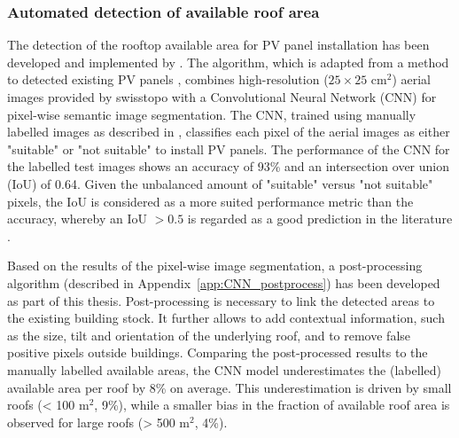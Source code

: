 \subsubsection{Automated detection of available roof area}

The detection of the rooftop available area for PV panel installation has been developed and implemented by \citet{castello_quantification_2021}.
The algorithm, which is adapted from a method to detected existing PV panels \cite{castello_deep_2019}, 
combines high-resolution ($25 \times 25$ cm$^2$) aerial images
provided by swisstopo \cite{swiss_federal_institue_of_topography_swisstopo_swissimage_nodate} with a Convolutional Neural Network (CNN) for pixel-wise semantic image segmentation. 
The CNN, trained using manually labelled images as described in \cite{castello_quantification_2021}, classifies each pixel of the aerial images as either "suitable" or "not suitable" to install PV panels. 
The performance of the CNN for the labelled test images shows an accuracy of 93\% and an intersection over union (IoU) of 0.64. 
Given the unbalanced amount of "suitable" versus "not suitable" pixels, the IoU is considered as a more suited performance metric than the accuracy, whereby an IoU $> 0.5$ is regarded as a good prediction in the literature \cite{castello_quantification_2021}. %

Based on the results of the pixel-wise image segmentation, a post-processing algorithm (described in Appendix~\ref{app:CNN_postprocess}) has been developed as part of this thesis.
Post-processing is necessary to link the detected areas to the existing building stock. It further allows to add contextual information, such as the size, tilt and orientation of the underlying roof, and to remove false positive pixels outside buildings. 
Comparing the post-processed results to the manually labelled available areas, the CNN model underestimates the (labelled) available area per roof by 8\% on average. 
This underestimation is driven by small roofs (< 100 m$^2$, 9\%), while a smaller bias in the fraction of available roof area is observed for large roofs (> 500 m$^2$, 4\%).

